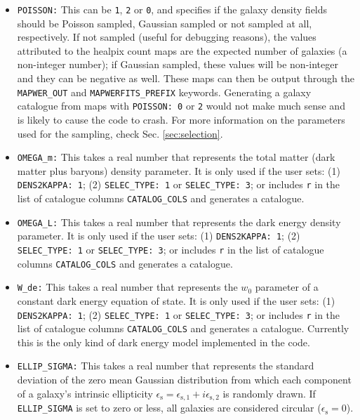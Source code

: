 \documentclass[12pt]{book} %
\newcommand{\nv}[1]{\mathrm{#1}}                 %
\begin{document}
\begin{itemize}
\item {\tt POISSON:} This can be {\tt 1}, {\tt 2} or {\tt 0}, and specifies if the galaxy density 
  fields should be Poisson sampled, Gaussian sampled or not sampled at all, respectively. 
  If not sampled (useful for debugging reasons), the values attributed to the {\sc healpix} count maps 
  are the expected number of galaxies (a non-integer number); if Gaussian sampled, these values 
  will be non-integer and they can be negative as well. These maps can then be output 
  through the {\tt MAPWER\_OUT} and {\tt MAPWERFITS\_PREFIX} keywords. Generating a galaxy catalogue 
  from maps with {\tt POISSON: 0} or {\tt 2} would not make much sense and is likely to cause the 
  code to crash. For more information on the parameters used for the sampling, check Sec. 
  \ref{sec:selection}.

\item {\tt OMEGA\_m:} This takes a real number that represents the total matter (dark matter 
  plus baryons) density parameter. It is only used if the user sets: (1) {\tt DENS2KAPPA: 1}; 
  (2) {\tt SELEC\_TYPE: 1} or {\tt SELEC\_TYPE: 3}; or includes {\tt r} in the 
  list of catalogue columns {\tt CATALOG\_COLS} and generates a catalogue.

\item {\tt OMEGA\_L:} This takes a real number that represents the dark energy density parameter. 
  It is only used if the user sets:  (1) {\tt DENS2KAPPA: 1}; 
  (2) {\tt SELEC\_TYPE: 1} or {\tt SELEC\_TYPE: 3}; or includes {\tt r} in the 
  list of catalogue columns {\tt CATALOG\_COLS} and generates a catalogue.

\item {\tt W\_de:} This takes a real number that represents the $w_0$ parameter of a constant dark energy 
  equation of state. It is only used if the user sets:  (1) {\tt DENS2KAPPA: 1}; 
  (2) {\tt SELEC\_TYPE: 1} or {\tt SELEC\_TYPE: 3}; or includes {\tt r} in the 
  list of catalogue columns {\tt CATALOG\_COLS} and generates a catalogue.
  Currently this is the only kind of dark energy model implemented in the code. 

\item {\tt ELLIP\_SIGMA:} This takes a real number that represents the standard deviation of the zero mean 
  Gaussian distribution from which each component of a galaxy's intrinsic ellipticity 
  $\epsilon_{\nv{s}}=\epsilon_{\nv{s},1}+i\epsilon_{\nv{s},2}$ is randomly drawn. If {\tt ELLIP\_SIGMA} is 
  set to zero or less, all galaxies are considered circular ($\epsilon_{\nv{s}}=0$).


\end{itemize}
\end{document}
